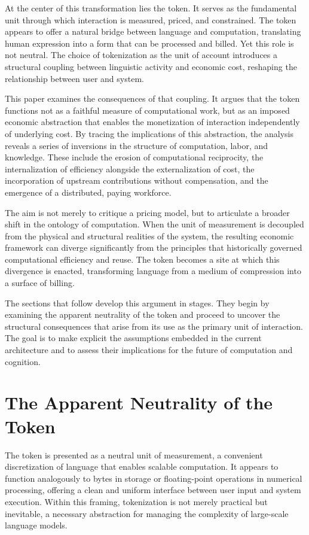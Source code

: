 \documentclass[12pt, oneside]{article}
\begin{document}
At the center of this transformation lies the token. It serves as the fundamental unit through which interaction is measured, priced, and constrained. The token appears to offer a natural bridge between language and computation, translating human expression into a form that can be processed and billed. Yet this role is not neutral. The choice of tokenization as the unit of account introduces a structural coupling between linguistic activity and economic cost, reshaping the relationship between user and system.

This paper examines the consequences of that coupling. It argues that the token functions not as a faithful measure of computational work, but as an imposed economic abstraction that enables the monetization of interaction independently of underlying cost. By tracing the implications of this abstraction, the analysis reveals a series of inversions in the structure of computation, labor, and knowledge. These include the erosion of computational reciprocity, the internalization of efficiency alongside the externalization of cost, the incorporation of upstream contributions without compensation, and the emergence of a distributed, paying workforce.

The aim is not merely to critique a pricing model, but to articulate a broader shift in the ontology of computation. When the unit of measurement is decoupled from the physical and structural realities of the system, the resulting economic framework can diverge significantly from the principles that historically governed computational efficiency and reuse. The token becomes a site at which this divergence is enacted, transforming language from a medium of compression into a surface of billing.

The sections that follow develop this argument in stages. They begin by examining the apparent neutrality of the token and proceed to uncover the structural consequences that arise from its use as the primary unit of interaction. The goal is to make explicit the assumptions embedded in the current architecture and to assess their implications for the future of computation and cognition.

\section{The Apparent Neutrality of the Token}

The token is presented as a neutral unit of measurement, a convenient discretization of language that enables scalable computation. It appears to function analogously to bytes in storage or floating-point operations in numerical processing, offering a clean and uniform interface between user input and system execution. Within this framing, tokenization is not merely practical but inevitable, a necessary abstraction for managing the complexity of large-scale language models.
\end{document}
